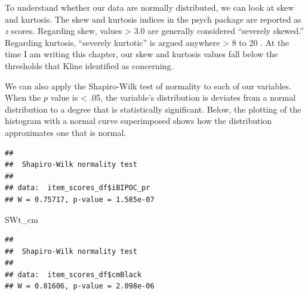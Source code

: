 \documentclass[
  11pt,
]{book}
\newenvironment{Shaded}{\begin{snugshade}}{\end{snugshade}}
\newcommand{\CommentTok}[1]{\textcolor[rgb]{0.56,0.35,0.01}{\textit{#1}}}
\newcommand{\FunctionTok}[1]{\textcolor[rgb]{0.00,0.00,0.00}{#1}}
\newcommand{\NormalTok}[1]{#1}
\newcommand{\OtherTok}[1]{\textcolor[rgb]{0.56,0.35,0.01}{#1}}
\newcommand{\SpecialCharTok}[1]{\textcolor[rgb]{0.00,0.00,0.00}{#1}}
\begin{document}
To understand whether our data are normally distributed, we can look at skew and kurtosis. The skew and kurtosis indices in the psych package are reported as \emph{z} scores. Regarding skew, values \textgreater{} 3.0 are generally considered ``severely skewed.'' Regarding kurtosis, ``severely kurtotic'' is argued anywhere \textgreater{} 8 to 20 \citep{kline_principles_2016}. At the time I am writing this chapter, our skew and kurtosis values fall below the thresholds that Kline identified as concerning.

We can also apply the Shapiro-Wilk test of normality to each of our variables. When the \(p\) value is \textless{} .05, the variable's distribution is deviates from a normal distribution to a degree that is statistically significant. Below, the plotting of the histogram with a normal curve superimposed shows how the distribution approximates one that is normal.

\begin{Shaded}
\end{Shaded}

\begin{verbatim}
## 
##  Shapiro-Wilk normality test
## 
## data:  item_scores_df$iBIPOC_pr
## W = 0.75717, p-value = 1.585e-07
\end{verbatim}

\begin{Shaded}
\begin{Highlighting}[]
\NormalTok{SWt\_cm}
\end{Highlighting}
\end{Shaded}

\begin{verbatim}
## 
##  Shapiro-Wilk normality test
## 
## data:  item_scores_df$cmBlack
## W = 0.81606, p-value = 2.098e-06
\end{verbatim}
\end{document}
